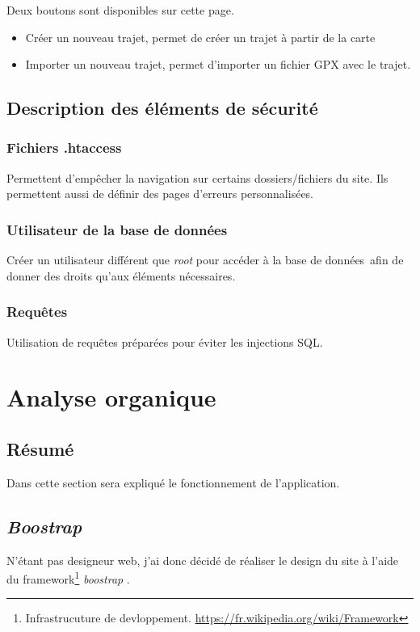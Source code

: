 \documentclass[a4paper]{article}
\newcommand{\bdd}{base de données}
\newcommand{\bt}{\emph{boostrap }}
\begin{document}
Deux boutons sont disponibles sur cette page.
\begin{itemize}
    \item Créer un nouveau trajet, permet de créer un trajet à partir de la carte
    \item Importer un nouveau trajet, permet d'importer un fichier GPX avec le trajet.
\end{itemize}

\subsection{Description des éléments de sécurité}
\subsubsection{Fichiers .htaccess}
Permettent d'empêcher la navigation sur certains dossiers/fichiers du site. Ils permettent aussi de définir des pages d'erreurs personnalisées.

\subsubsection{Utilisateur de la base de données}
Créer un utilisateur différent que \emph{root} pour accéder à la \bdd \ afin de donner des droits qu'aux éléments nécessaires.

\subsubsection{Requêtes}
Utilisation de requêtes préparées pour éviter les injections SQL.


\pagebreak








\pagebreak


\section{Analyse organique} 
\subsection{Résumé}
Dans cette section sera expliqué le fonctionnement de l'application.

\subsection{\emph{Boostrap}}
N'étant pas designeur web, j'ai donc décidé de réaliser le design du site à l'aide du framework\footnote{Infrastrucuture de devloppement. \url{https://fr.wikipedia.org/wiki/Framework}} \bt.
\end{document}
